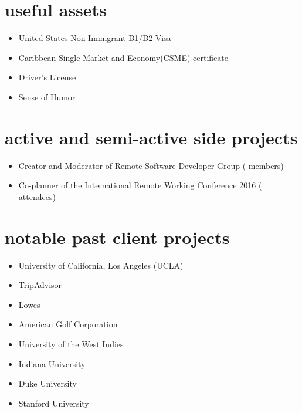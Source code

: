 \documentclass[]{friggeri-cv} %
\begin{document}

\section{useful assets}
\begin{itemize}
	\item United States Non-Immigrant B1/B2 Visa
    \item Caribbean Single Market and Economy(CSME) certificate
    \item Driver's License
    \item Sense of Humor
\end{itemize}


\section{active and semi-active side projects}
\begin{itemize}
	\item Creator and Moderator of {\href{http://remotesoftwaredeveloper.com}{Remote Software Developer Group}} ( members)
    \item Co-planner of the {\href{http://remoteworkingconf.com}{International Remote Working Conference 2016}} ( attendees)
\end{itemize}

\section{notable past client projects}
\begin{multicols}{2}
    \begin{itemize}
        \item University of California, Los Angeles (UCLA)
        \item TripAdvisor
        \item Lowes
        \item American Golf Corporation
    \end{itemize}
    \columnbreak
        \begin{itemize}
            \item University of the West Indies
            \item Indiana University
            \item Duke University
            \item Stanford University
        \end{itemize}
\end{multicols}
\end{document}
